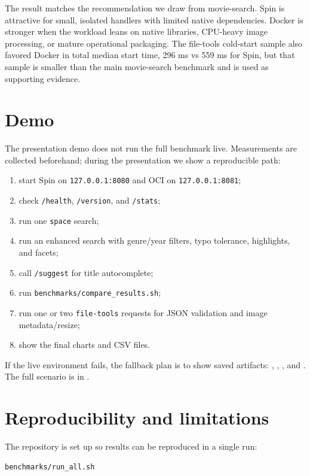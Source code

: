 \documentclass[11pt,a4paper]{article}
\begin{document}
The result matches the recommendation we draw from movie-search. Spin is attractive for
small, isolated handlers with limited native dependencies. Docker is stronger when the workload
leans on native libraries, CPU-heavy image processing, or mature operational packaging. The
file-tools cold-start sample also favored Docker in total median start time, 296 ms vs 559 ms
for Spin, but that sample is smaller than the main movie-search benchmark and is used as
supporting evidence.

\section{Demo}

The presentation demo does not run the full benchmark live. Measurements are collected
beforehand; during the presentation we show a reproducible path:

\begin{enumerate}
  \item start Spin on \texttt{127.0.0.1:8080} and OCI on \texttt{127.0.0.1:8081};
  \item check \texttt{/health}, \texttt{/version}, and \texttt{/stats};
  \item run one \texttt{space} search;
  \item run an enhanced search with genre/year filters, typo tolerance, highlights, and facets;
  \item call \texttt{/suggest} for title autocomplete;
  \item run \texttt{benchmarks/compare\_results.sh};
  \item run one or two \texttt{file-tools} requests for JSON validation and image metadata/resize;
  \item show the final charts and CSV files.
\end{enumerate}

If the live environment fails, the fallback plan is to show saved artifacts:
, , , and
. The full scenario is in
.

\section{Reproducibility and limitations}

The repository is set up so results can be reproduced in a single run:

\begin{verbatim}
benchmarks/run_all.sh
\end{verbatim}
\end{document}
